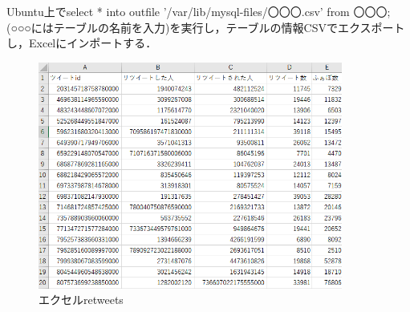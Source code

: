 Ubuntu上でselect * into outfile '/var/lib/mysql-files/〇〇〇.csv' from 〇〇〇;(○○○にはテーブルの名前を入力)を実行し，テーブルの情報CSVでエクスポートし，Excelにインポートする．

\begin{figure}[htb]
\centering
\includegraphics[width=10cm]{excel_retweets.png}
\caption{エクセルretweets}\label{excel_retweets}
\end{figure}

\clearpage

